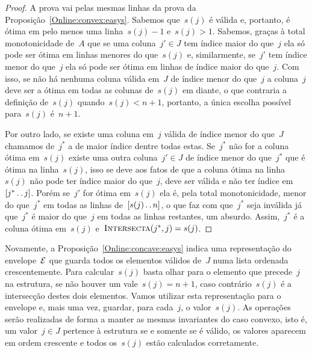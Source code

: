 \begin{proof}
A prova vai pelas mesmas linhas da prova da Proposição~\ref{Online:convex:easys}. Sabemos que~$s(j)$ é válida e, portanto, é ótima em pelo menos uma linha~$s(j) - 1$ e~$s(j) > 1$. Sabemos, graças à total monotonicidade de~$A$ que se uma coluna~$j' \in J$ tem índice maior do que~$j$ ela só pode ser ótima em linhas menores do que~$s(j)$ e, similarmente, se~$j'$ tem índice menor do que~$j$ ela só pode ser ótima em linhas de índice maior do que~$j$. Com isso, se não há nenhuma coluna válida em~$J$ de índice menor do que~$j$ a coluna~$j$ deve ser a ótima em todas as colunas de~$s(j)$ em diante, o que contraria a definição de~$s(j)$ quando~$s(j) < n+1$, portanto, a única escolha possível para~$s(j)$ é~$n+1$.

Por outro lado, se existe uma coluna em~$j$ válida de índice menor do que~$J$ chamamos de~$j^*$ a de maior índice dentre todas estas. Se~$j^*$ não for a coluna ótima em~$s(j)$ existe uma outra coluna~$j' \in J$ de índice menor do que~$j^*$ que é ótima na linha~$s(j)$, isso se deve aos fatos de que a coluna ótima na linha~$s(j)$ não pode ter índice maior do que~$j$, deve ser válida e não ter índice em~$[j^* \,.\,.\, j]$. Porém se~$j'$ for ótima em~$s(j)$ ela é, pela total monotonicidade, menor do que~$j^*$ em todas as linhas de~$[s(j) \,.\,.\, n]$, o que faz com que~$j^*$ seja inválida já que~$j^*$ é maior do que~$j$ em todas as linhas restantes, um absurdo. Assim,~$j^*$ é a coluna ótima em~$s(j)$ e~$\textsc{Intersecta}(j^*,j) = s(j)$.
\end{proof}

Novamente, a Proposição~\ref{Online:concave:easys} indica uma representação do envelope~$\mathcal{E}$ que guarda todos os elementos válidos de~$J$ numa lista ordenada crescentemente. Para calcular~$s(j)$ basta olhar para o elemento que precede~$j$ na estrutura, se não houver um vale~$s(j) = n+1$, caso contrário~$s(j)$ é a intersecção destes dois elementos. Vamos utilizar esta representação para o envelope e, mais uma vez, guardar, para cada~$j$, o valor~$s(j)$. As operações serão realizadas de forma a manter as mesmas invariantes do caso convexo, isto é, um valor~$j \in J$ pertence à estrutura se e somente se é válido, os valores aparecem em ordem crescente e todos os~$s(j)$ estão calculados corretamente.

